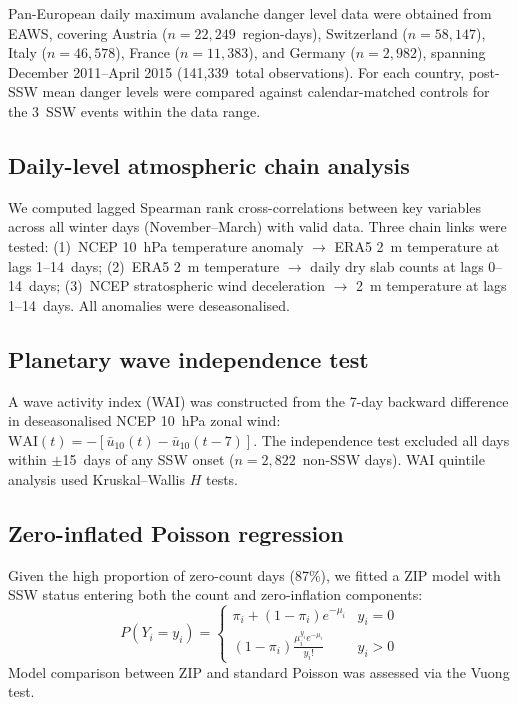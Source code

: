 \documentclass[11pt,letterpaper]{article}
\begin{document}
Pan-European daily maximum avalanche danger level data were obtained from EAWS, covering Austria ($n = 22{,}249$~region-days), Switzerland ($n = 58{,}147$), Italy ($n = 46{,}578$), France ($n = 11{,}383$), and Germany ($n = 2{,}982$), spanning December 2011--April 2015 (141{,}339~total observations). For each country, post-SSW mean danger levels were compared against calendar-matched controls for the 3~SSW events within the data range.

\subsection{Daily-level atmospheric chain analysis}

We computed lagged Spearman rank cross-correlations between key variables across all winter days (November--March) with valid data. Three chain links were tested: (1)~NCEP 10~hPa temperature anomaly $\to$ ERA5 2~m temperature at lags 1--14~days; (2)~ERA5 2~m temperature $\to$ daily dry slab counts at lags 0--14~days; (3)~NCEP stratospheric wind deceleration $\to$ 2~m temperature at lags 1--14~days. All anomalies were deseasonalised.

\subsection{Planetary wave independence test}

A wave activity index (WAI) was constructed from the 7-day backward difference in deseasonalised NCEP 10~hPa zonal wind: $\mathrm{WAI}(t) = -[\bar{u}_{10}(t) - \bar{u}_{10}(t{-}7)]$. The independence test excluded all days within $\pm$15~days of any SSW onset ($n = 2{,}822$~non-SSW days). WAI quintile analysis used Kruskal--Wallis $H$ tests.

\subsection{Zero-inflated Poisson regression}

Given the high proportion of zero-count days (87\%), we fitted a ZIP model with SSW status entering both the count and zero-inflation components:
\[
P(Y_i = y_i) = \begin{cases}
\pi_i + (1 - \pi_i) e^{-\mu_i} & y_i = 0 \\
(1 - \pi_i) \frac{\mu_i^{y_i} e^{-\mu_i}}{y_i!} & y_i > 0
\end{cases}
\]
Model comparison between ZIP and standard Poisson was assessed via the Vuong test.
\end{document}
